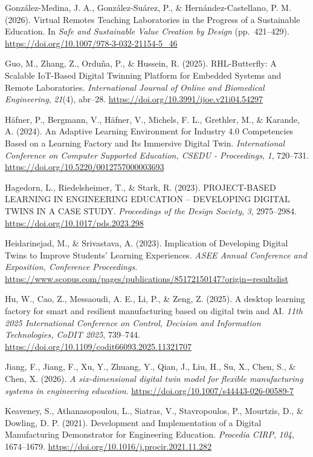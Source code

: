 González-Medina, J. A., González-Suárez, P., \& Hernández-Castellano, P.
M. (2026). Virtual Remotes Teaching Laboratories in the Progress of a
Sustainable Education. In \emph{Safe and Sustainable Value Creation by
Design} (pp.~421--429). \url{https://doi.org/10.1007/978-3-032-21154-5_46}

Guo, M., Zhang, Z., Orduña, P., \& Hussein, R. (2025). RHL-Butterfly: A
Scalable IoT-Based Digital Twinning Platform for Embedded Systems and
Remote Laboratories. \emph{International Journal of Online and Biomedical
Engineering}, \emph{21}(4), abr--28.
\url{https://doi.org/10.3991/ijoe.v21i04.54297}

Häfner, P., Bergmann, V., Häfner, V., Michels, F. L., Grethler, M., \&
Karande, A. (2024). An Adaptive Learning Environment for Industry 4.0
Competencies Based on a Learning Factory and Its Immersive Digital Twin.
\emph{International Conference on Computer Supported Education, CSEDU -
Proceedings}, \emph{1}, 720--731. \url{https://doi.org/10.5220/0012757000003693}

Hagedorn, L., Riedelsheimer, T., \& Stark, R. (2023). PROJECT-BASED
LEARNING IN ENGINEERING EDUCATION -- DEVELOPING DIGITAL TWINS IN A CASE
STUDY. \emph{Proceedings of the Design Society}, \emph{3}, 2975--2984.
\url{https://doi.org/10.1017/pds.2023.298}

Heidarinejad, M., \& Srivastava, A. (2023). Implication of Developing
Digital Twins to Improve Students' Learning Experiences. \emph{ASEE Annual
Conference and Exposition, Conference Proceedings}.
\url{https://www.scopus.com/pages/publications/85172150147?origin=resultslist}

Hu, W., Cao, Z., Messaoudi, A. E., Li, P., \& Zeng, Z. (2025). A desktop
learning factory for smart and resilient manufacturing based on digital
twin and AI. \emph{11th 2025 International Conference on Control, Decision
and Information Technologies, CoDIT 2025}, 739--744.
\url{https://doi.org/10.1109/codit66093.2025.11321707}

Jiang, F., Jiang, F., Xu, Y., Zhuang, Y., Qian, J., Liu, H., Su, X.,
Chen, S., \& Chen, X. (2026). \emph{A six-dimensional digital twin model for
flexible manufacturing systems in engineering education}.
\url{https://doi.org/10.1007/s44443-026-00589-7}

Keaveney, S., Athanasopoulou, L., Siatras, V., Stavropoulos, P.,
Mourtzis, D., \& Dowling, D. P. (2021). Development and Implementation of
a Digital Manufacturing Demonstrator for Engineering Education.
\emph{Procedia CIRP}, \emph{104}, 1674--1679.
\url{https://doi.org/10.1016/j.procir.2021.11.282}

